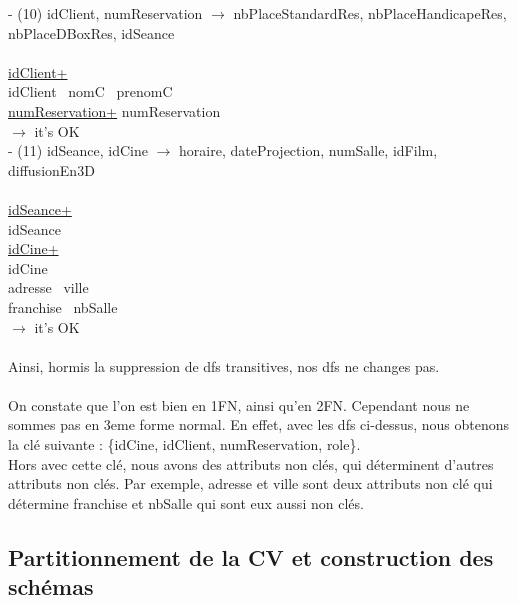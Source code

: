 \documentclass[a4paper,sffamily,12pt]{article}
\begin{document}
				\noindent - (10) idClient, numReservation $\rightarrow$ nbPlaceStandardRes, nbPlaceHandicapeRes, nbPlaceDBoxRes, idSeance \\
					\\
					\underline{idClient+} \\
					idClient \ nomC \ prenomC \\
					\underline{numReservation+}
					numReservation \\									
				$\rightarrow$ it's OK \\		

				\noindent - (11) idSeance, idCine $\rightarrow$ horaire, dateProjection, numSalle, idFilm, diffusionEn3D \\
					\\
					\underline{idSeance+} \\
					idSeance \\
					\underline{idCine+}\\
					idCine \\ adresse \ ville \\ franchise \ nbSalle \\							
				$\rightarrow$ it's OK \\							
				\\		
				\noindent Ainsi, hormis la suppression de dfs transitives, nos dfs ne changes pas. \\																
				\\
				On constate que l'on est bien en 1FN, ainsi qu'en 2FN. Cependant nous ne sommes pas en 3eme forme normal. En effet, avec les dfs ci-dessus, nous obtenons la clé suivante : \{idCine, idClient, numReservation, role\}. \\
				Hors avec cette clé, nous avons des attributs non clés, qui déterminent d'autres attributs non clés. Par exemple, adresse et ville sont deux attributs non clé qui détermine franchise et nbSalle qui sont eux aussi non clés. \\
				
				\vspace{0.5cm}
													
			\subsection{Partitionnement de la CV et construction des schémas} 	
			
				\vspace{0.5cm}
			
\end{document}
